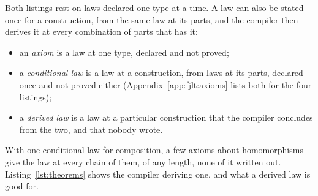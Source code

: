 Both listings rest on laws declared one type at a time.
A law can also be stated once for a construction, from the same law at its parts, and the compiler then derives it at every combination of parts that has it:
\begin{itemize}
\item an \emph{axiom} is a law at one type, declared and not proved;
\item a \emph{conditional law} is a law at a construction, from laws at its parts, declared once and not proved either (Appendix~\ref{app:fjlt:axioms} lists both for the four listings);
\item a \emph{derived law} is a law at a particular construction that the compiler concludes from the two, and that nobody wrote.
\end{itemize}
With one conditional law for composition, a few axioms about homomorphisms give the law at every chain of them, of any length, none of it written out.
Listing~\ref{lst:theorems} shows the compiler deriving one, and what a derived law is good for.

